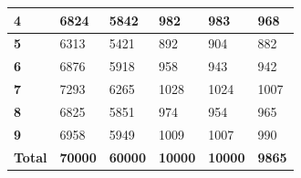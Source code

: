 \documentclass[11pt,onside]{article}
\begin{document}
\begin{table}[h]
\begin{tabular}{|l|l|l|l|l|l|}
\textbf{4}     & 6824                                                            & 5842                                                             & 982                                                          & 983                                                                & 968                                                                \\ \hline
\textbf{5}     & 6313                                                            & 5421                                                             & 892                                                          & 904                                                                & 882                                                                \\ \hline
\textbf{6}     & 6876                                                            & 5918                                                             & 958                                                          & 943                                                                & 942                                                                \\ \hline
\textbf{7}     & 7293                                                            & 6265                                                             & 1028                                                         & 1024                                                               & 1007                                                               \\ \hline
\textbf{8}     & 6825                                                            & 5851                                                             & 974                                                          & 954                                                                & 965                                                                \\ \hline
\textbf{9}     & 6958                                                            & 5949                                                             & 1009                                                         & 1007                                                               & 990                                                                \\ \hline
\textbf{Total} & \textbf{70000}                                                  & \textbf{60000}                                                   & \textbf{10000}                                               & \textbf{10000}                                                     & \textbf{9865}                                                      \\ \hline
\end{tabular}

\end{table}
\end{document}
